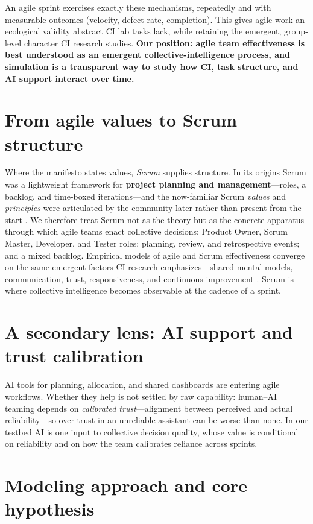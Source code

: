 \documentclass{article}
\begin{document}
An agile sprint exercises exactly these mechanisms, repeatedly and with measurable outcomes (velocity, defect rate, completion). This gives agile work an ecological validity abstract CI lab tasks lack, while retaining the emergent, group-level character CI research studies. \textbf{Our position: agile team effectiveness is best understood as an emergent collective-intelligence process, and simulation is a transparent way to study how CI, task structure, and AI support interact over time.}

\section{From agile values to Scrum structure}

Where the manifesto states values, \emph{Scrum} supplies structure. In its origins Scrum was a lightweight framework for \textbf{project planning and management}---roles, a backlog, and time-boxed iterations---and the now-familiar Scrum \emph{values} and \emph{principles} were articulated by the community later rather than present from the start \citep{Schwaber2020}. We therefore treat Scrum not as the theory but as the concrete apparatus through which agile teams enact collective decisions: Product Owner, Scrum Master, Developer, and Tester roles; planning, review, and retrospective events; and a mixed backlog. Empirical models of agile and Scrum effectiveness converge on the same emergent factors CI research emphasizes---shared mental models, communication, trust, responsiveness, and continuous improvement \citep{Verwijs2023,strode2022teamwork}. Scrum is where collective intelligence becomes observable at the cadence of a sprint.

\section{A secondary lens: AI support and trust calibration}

AI tools for planning, allocation, and shared dashboards are entering agile workflows. Whether they help is not settled by raw capability: human--AI teaming depends on \emph{calibrated trust}---alignment between perceived and actual reliability---so over-trust in an unreliable assistant can be worse than none. In our testbed AI is one input to collective decision quality, whose value is conditional on reliability and on how the team calibrates reliance across sprints.

\section{Modeling approach and core hypothesis}
\end{document}
